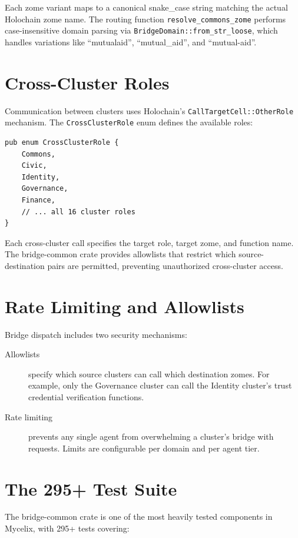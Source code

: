 \documentclass[12pt]{book}
\begin{document}
Each zome variant maps to a canonical snake\_case string matching the actual
Holochain zome name. The routing function \texttt{resolve\_commons\_zome}
performs case-insensitive domain parsing via \texttt{BridgeDomain::from\_str\_loose},
which handles variations like ``mutualaid'', ``mutual\_aid'', and ``mutual-aid''.

\section{Cross-Cluster Roles}

Communication between clusters uses Holochain's \texttt{CallTargetCell::OtherRole}
mechanism. The \texttt{CrossClusterRole} enum defines the available roles:

\begin{lstlisting}
pub enum CrossClusterRole {
    Commons,
    Civic,
    Identity,
    Governance,
    Finance,
    // ... all 16 cluster roles
}
\end{lstlisting}

Each cross-cluster call specifies the target role, target zome, and function
name. The bridge-common crate provides allowlists that restrict which
source-destination pairs are permitted, preventing unauthorized cross-cluster
access.

\section{Rate Limiting and Allowlists}

Bridge dispatch includes two security mechanisms:

\begin{description}
  \item[Allowlists] specify which source clusters can call which destination
    zomes. For example, only the Governance cluster can call the Identity
    cluster's trust credential verification functions.
  \item[Rate limiting] prevents any single agent from overwhelming a cluster's
    bridge with requests. Limits are configurable per domain and per agent tier.
\end{description}

\section{The 295+ Test Suite}

The bridge-common crate is one of the most heavily tested components in Mycelix,
with 295+ tests covering:
\end{document}

